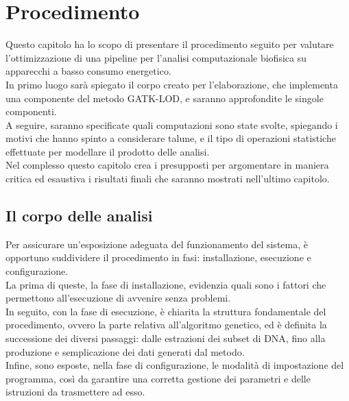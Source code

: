 \chapter{Procedimento}
Questo capitolo ha lo scopo di presentare il procedimento seguito per valutare l'ottimizzazione di una pipeline per l'analisi computazionale biofisica su apparecchi a basso consumo energetico. \\
In primo luogo sarà spiegato il corpo creato per l'elaborazione, che implementa una componente del metodo GATK-LOD, e saranno approfondite le singole componenti.\\
A seguire, saranno specificate quali computazioni sono state svolte, spiegando i motivi che hanno spinto a considerare talune, e il tipo di operazioni statistiche effettuate per modellare il prodotto delle analisi. \\
Nel complesso questo capitolo crea i presupposti per argomentare in maniera critica ed esaustiva i risultati finali che saranno mostrati nell'ultimo capitolo.  


\section{Il corpo delle analisi}
Per assicurare un'esposizione adeguata del funzionamento del sistema, è opportuno suddividere il procedimento in fasi: installazione, esecuzione e configurazione. \\
La prima di queste, la fase di installazione, evidenzia quali sono i fattori che permettono all'esecuzione di avvenire senza problemi. \\
In seguito, con la fase di esecuzione, è chiarita la struttura fondamentale del procedimento, ovvero la parte relativa all'algoritmo genetico, ed è definita la successione dei diversi passaggi: dalle estrazioni dei subset di DNA, fino alla produzione e semplicazione dei dati generati dal metodo. \\
Infine, sono esposte, nella fase di configurazione, le modalità di impostazione del programma, così da garantire una corretta gestione dei parametri e delle istruzioni da trasmettere ad esso.\\

